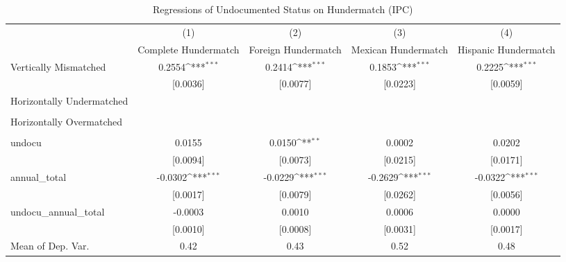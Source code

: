 \begin{table}[htbp]\centering
\def\sym#1{\ifmmode^{#1}\else\(^{#1}\)\fi}
\caption{Regressions of Undocumented Status on Hundermatch (IPC)}
\begin{tabular}{l*{4}{c}}
\toprule
                    &\multicolumn{1}{c}{(1)}         &\multicolumn{1}{c}{(2)}         &\multicolumn{1}{c}{(3)}         &\multicolumn{1}{c}{(4)}         \\
                    &Complete Hundermatch         &Foreign Hundermatch         &Mexican Hundermatch         &Hispanic Hundermatch         \\
\midrule
Vertically Mismatched&      0.2554\sym{***}&      0.2414\sym{***}&      0.1853\sym{***}&      0.2225\sym{***}\\
                    &    [0.0036]         &    [0.0077]         &    [0.0223]         &    [0.0059]         \\
\addlinespace
Horizontally Undermatched&                     &                     &                     &                     \\
                    &                     &                     &                     &                     \\
\addlinespace
Horizontally Overmatched&                     &                     &                     &                     \\
                    &                     &                     &                     &                     \\
\addlinespace
undocu              &      0.0155         &      0.0150\sym{**} &      0.0002         &      0.0202         \\
                    &    [0.0094]         &    [0.0073]         &    [0.0215]         &    [0.0171]         \\
\addlinespace
annual\_total        &     -0.0302\sym{***}&     -0.0229\sym{***}&     -0.2629\sym{***}&     -0.0322\sym{***}\\
                    &    [0.0017]         &    [0.0079]         &    [0.0262]         &    [0.0056]         \\
\addlinespace
undocu\_annual\_total &     -0.0003         &      0.0010         &      0.0006         &      0.0000         \\
                    &    [0.0010]         &    [0.0008]         &    [0.0031]         &    [0.0017]         \\
\midrule
Mean of Dep. Var.   &        0.42         &        0.43         &        0.52         &        0.48         \\

\end{tabular}
\end{table}
